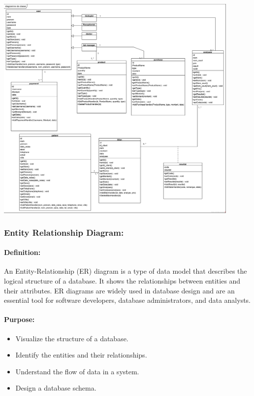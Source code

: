 \documentclass{article}
\begin{document}
\begin{center}
    \includegraphics[width=451px]{media/class diagrams/app class diagram.png}
\end{center}

\newpage

\subsubsection*{Entity Relationship Diagram:}

\paragraph*{\textbf{Definition:}}

An Entity-Relationship (ER) diagram is a type of data model that describes the logical structure of a database. It shows the relationships between entities and their attributes. ER diagrams are widely used in database design and are an essential tool for software developers, database administrators, and data analysts.

\paragraph*{\textbf{Purpose:}}
\begin{itemize}
    \item Visualize the structure of a database.
    \item Identify the entities and their relationships.
    \item Understand the flow of data in a system.
    \item Design a database schema.
\end{itemize}
\end{document}
